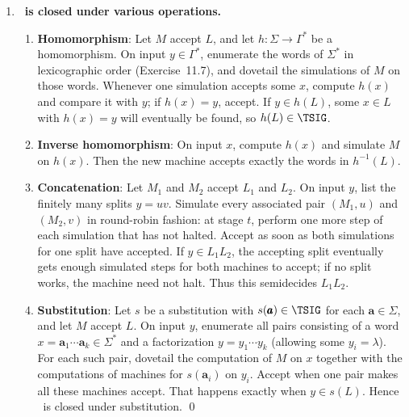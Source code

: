 \begin{enumerate}[{11.}1. ]
\begin{enumerate}
A separator can be removed only by $a\#b\to ab$. At that moment the untagged
letters $a$ and $b$ remain between the two copies, so no tagged production can
ever cross their former boundary, even if an unfinished tagged substring occurs
farther to the right. Therefore every terminal word derived from $W$ is a finite
concatenation of words in $L(G)$, and
$L(G_*)\subseteq L(G)^*$. Hence $L(G_*)=L(G)^*$. \qed
\end{enumerate}

\item \textbf{\TSIG\ is closed under various operations.}

\begin{enumerate}
\item \textbf{Homomorphism}: Let $M$ accept $L$, and let $h:\Sigma\to\Gamma^*$ be
a homomorphism. On input $y\in\Gamma^*$, enumerate the words of $\Sigma^*$ in
lexicographic order (Exercise~11.7), and dovetail the simulations of $M$ on
those words. Whenever one simulation accepts some $x$, compute $h(x)$ and
compare it with $y$; if $h(x)=y$, accept. If $y\in h(L)$, some $x\in L$ with
$h(x)=y$ will eventually be found, so $h(L)\in\TSIG$.

\item \textbf{Inverse homomorphism}: On input $x$, compute $h(x)$ and simulate
$M$ on $h(x)$. Then the new machine accepts exactly the words in
$h^{-1}(L)$.

\item \textbf{Concatenation}: Let $M_1$ and $M_2$ accept $L_1$ and $L_2$. On
input $y$, list the finitely many splits $y=uv$. Simulate every associated pair
$(M_1,u)$ and $(M_2,v)$ in round-robin fashion: at stage $t$, perform one more
step of each simulation that has not halted. Accept as soon as both simulations
for one split have accepted. If $y\in L_1L_2$, the accepting split eventually
gets enough simulated steps for both machines to accept; if no split works, the
machine need not halt. Thus this semidecides $L_1L_2$.

\item \textbf{Substitution}: Let $s$ be a substitution with $s(\pmb{a})\in\TSIG$
for each $\pmb{a}\in\Sigma$, and let $M$ accept $L$. On input $y$, enumerate all
pairs consisting of a word $x=\pmb{a}_1\cdots\pmb{a}_k\in\Sigma^*$ and a
factorization $y=y_1\cdots y_k$ (allowing some $y_i=\lambda$). For each such
pair, dovetail the computation of $M$ on $x$ together with the computations of
machines for $s(\pmb{a}_i)$ on $y_i$. Accept when one pair makes all these
machines accept. That happens exactly when $y\in s(L)$. Hence \TSIG\ is closed
under substitution. \qed
\end{enumerate}


\end{enumerate}
